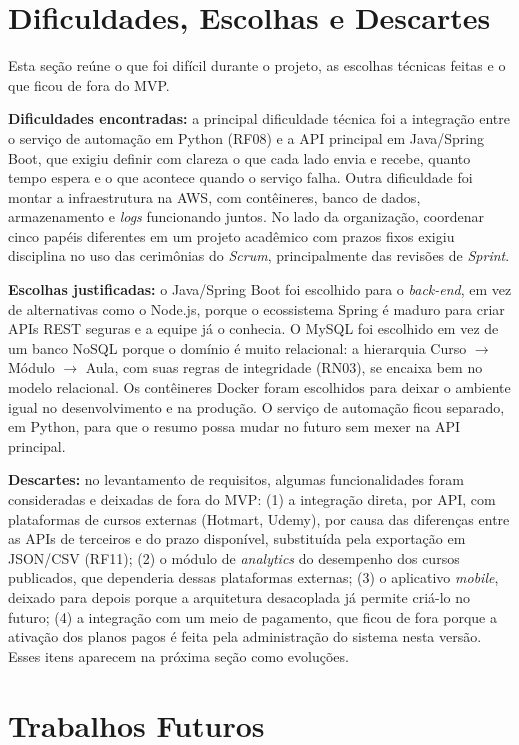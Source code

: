 \section{Dificuldades, Escolhas e Descartes}

Esta seção reúne o que foi difícil durante o projeto, as escolhas técnicas feitas e o que ficou de fora do MVP.

\textbf{Dificuldades encontradas:} a principal dificuldade técnica foi a integração entre o serviço de automação em Python (RF08) e a API principal em Java/Spring Boot, que exigiu definir com clareza o que cada lado envia e recebe, quanto tempo espera e o que acontece quando o serviço falha. Outra dificuldade foi montar a infraestrutura na AWS, com contêineres, banco de dados, armazenamento e \textit{logs} funcionando juntos. No lado da organização, coordenar cinco papéis diferentes em um projeto acadêmico com prazos fixos exigiu disciplina no uso das cerimônias do \textit{Scrum}, principalmente das revisões de \textit{Sprint}.

\textbf{Escolhas justificadas:} o Java/Spring Boot foi escolhido para o \textit{back-end}, em vez de alternativas como o Node.js, porque o ecossistema Spring é maduro para criar APIs REST seguras e a equipe já o conhecia. O MySQL foi escolhido em vez de um banco NoSQL porque o domínio é muito relacional: a hierarquia Curso $\rightarrow$ Módulo $\rightarrow$ Aula, com suas regras de integridade (RN03), se encaixa bem no modelo relacional. Os contêineres Docker foram escolhidos para deixar o ambiente igual no desenvolvimento e na produção. O serviço de automação ficou separado, em Python, para que o resumo possa mudar no futuro sem mexer na API principal.

\textbf{Descartes:} no levantamento de requisitos, algumas funcionalidades foram consideradas e deixadas de fora do MVP: (1) a integração direta, por API, com plataformas de cursos externas (Hotmart, Udemy), por causa das diferenças entre as APIs de terceiros e do prazo disponível, substituída pela exportação em JSON/CSV (RF11); (2) o módulo de \textit{analytics} do desempenho dos cursos publicados, que dependeria dessas plataformas externas; (3) o aplicativo \textit{mobile}, deixado para depois porque a arquitetura desacoplada já permite criá-lo no futuro; (4) a integração com um meio de pagamento, que ficou de fora porque a ativação dos planos pagos é feita pela administração do sistema nesta versão. Esses itens aparecem na próxima seção como evoluções.

\section{Trabalhos Futuros}

